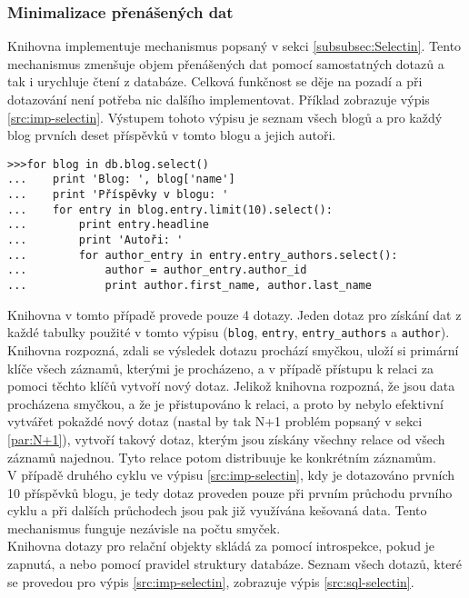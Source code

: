 \documentclass[ing,male,java,dept456]{diploma}						%
\begin{document}

\subsubsection{Minimalizace přenášených dat}

Knihovna implementuje mechanismus popsaný v sekci \ref{subsubsec:Selectin}. Tento mechanismus zmenšuje objem přenášených dat pomocí samostatných dotazů a tak i urychluje čtení z databáze. Celková funkčnost se děje na pozadí a při dotazování není potřeba nic dalšího implementovat. Příklad zobrazuje výpis \ref{src:imp-selectin}. Výstupem tohoto výpisu je seznam všech blogů a pro každý blog prvních deset příspěvků v tomto blogu a jejich autoři.

\begin{lstlisting}[style=custompython, label=src:imp-selectin, caption={Implementace samostatných dotazů v pypg}]
>>>for blog in db.blog.select()
...    print 'Blog: ', blog['name']
...    print 'Příspěvky v blogu: '
...    for entry in blog.entry.limit(10).select():
...        print entry.headline
...        print 'Autoři: '
...        for author_entry in entry.entry_authors.select():
...            author = author_entry.author_id
...            print author.first_name, author.last_name
\end{lstlisting}

Knihovna v tomto případě provede pouze 4 dotazy. Jeden dotaz pro získání dat z každé tabulky použité v tomto výpisu (\lstinline[style=inlinepython]|blog|, \lstinline[style=inlinepython]|entry|, \lstinline[style=inlinepython]|entry_authors| a \lstinline[style=inlinepython]|author|). \\
Knihovna rozpozná, zdali se výsledek dotazu prochází smyčkou, uloží si primární klíče všech záznamů, kterými je procházeno, a v případě přístupu k relaci za pomoci těchto klíčů vytvoří nový dotaz. Jelikož knihovna rozpozná, že jsou data procházena smyčkou, a že je přistupováno k relaci, a proto by nebylo efektivní vytvářet pokaždé nový dotaz (nastal by tak N+1 problém popsaný v sekci \ref{par:N+1}), vytvoří takový dotaz, kterým jsou získány všechny relace od všech záznamů najednou. Tyto relace potom distribuuje ke konkrétním záznamům. \\
V případě druhého cyklu ve výpisu \ref{src:imp-selectin}, kdy je dotazováno prvních 10 příspěvků blogu, je tedy dotaz proveden pouze při prvním průchodu prvního cyklu a při dalších průchodech jsou pak již využívána kešovaná data. Tento mechanismus funguje nezávisle na počtu smyček. \\
Knihovna dotazy pro relační objekty skládá za pomocí introspekce, pokud je zapnutá, a nebo pomocí pravidel struktury databáze. Seznam všech dotazů, které se provedou pro výpis \ref{src:imp-selectin}, zobrazuje výpis \ref{src:sql-selectin}.
\end{document}
